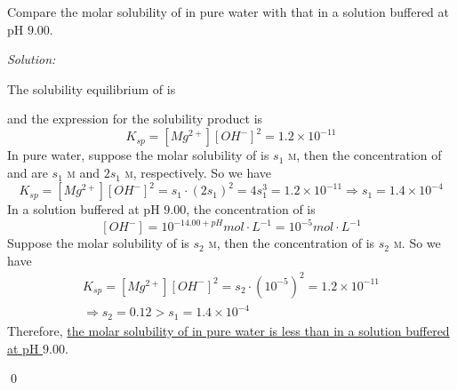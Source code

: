 \documentclass[12pt]{article}
\newenvironment{problem}[2][Problem]{\begin{trivlist}
\item[\hskip \labelsep {\bfseries #1}\hskip \labelsep {\bfseries #2.}]}{\end{trivlist}}
\newenvironment{sol}
    {\emph{Solution:}
    }
    {
    \qed
    }
\begin{document}
\begin{problem}{16.32}
Compare the molar solubility of  in pure water with that in a solution buffered at pH $9.00$.
\end{problem}
\begin{sol}
The solubility equilibrium of  is
\begin{center}
\end{center}
and the expression for the solubility product is
\[
K_{sp}=[Mg^{2+}][OH^-]^2=1.2\times10^{-11}
\]
In pure water, suppose the molar solubility of  is $s_1$ \textsc{m}, then the concentration of  and  are $s_1$ \textsc{m} and $2s_1$ \textsc{m}, respectively. So we have
\[
K_{sp}=[Mg^{2+}][OH^-]^2=s_1\cdot(2s_1)^2=4s_1^3=1.2\times10^{-11}\Longrightarrow s_1=1.4\times10^{-4}
\]
In a solution buffered at pH $9.00$, the concentration of  is
\[
[OH^-]=10^{-14.00+pH}mol\cdot L^{-1}=10^{-5}mol\cdot L^{-1}
\]
Suppose the molar solubility of  is $s_2$ \textsc{m}, then the concentration of  is $s_2$ \textsc{m}. So we have
\begin{gather*}
K_{sp}=[Mg^{2+}][OH^-]^2=s_2\cdot(10^{-5})^2=1.2\times10^{-11}\\
\Longrightarrow s_2=0.12>s_1=1.4\times10^{-4}
\end{gather*}
Therefore, \uline{the molar solubility of  in pure water is less than in a solution buffered at pH $9.00$}.
\end{sol}
\end{document}
